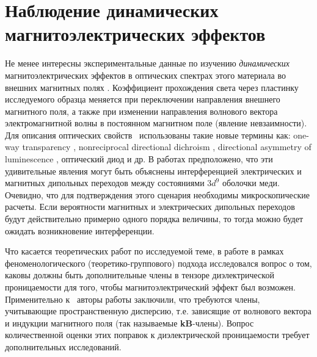 \section{Наблюдение динамических магнитоэлектрических эффектов}\label{sec:ch1/sec2}

Не менее интересны экспериментальные данные по изучению \emph{динамических} магнитоэлектрических эффектов в оптических спектрах этого материала во внешних магнитных полях \cite{Saito2008prl, Saito2008jpsj, Lovesey2009, Toyoda2015, Boldyrev2015}. Коэффициент прохождения света через пластинку исследуемого образца меняется при переключении направления внешнего магнитного поля, а также при изменении направления волнового вектора электромагнитной волны в постоянном магнитном поле (явление невзаимности). Для описания оптических свойств \cbo\ использованы такие новые термины как: one-way transparency \cite{Toyoda2015}, nonreciprocal directional dichroism \cite{Toyoda2015}, directional asymmetry of luminescence \cite{Toyoda2016}, оптический диод и др. В работах \cite{Toyoda2015, Toyoda2016} предположено, что эти удивительные явления могут быть объяснены интерференцией электрических и магнитных дипольных переходов между состояниями \(3d^9\) оболочки меди. Очевидно, что для подтверждения этого сценария необходимы микроскопические расчеты. Если вероятности магнитных и электрических дипольных переходов будут действительно примерно одного порядка величины, то тогда можно будет ожидать возникновение интерференции.

Что касается теоретических работ по исследуемой теме, в работе \cite{Nikitchenko2021} в рамках феноменологического (теоретико-группового) подхода исследовался вопрос о том, каковы должны быть дополнительные члены в тензоре диэлектрической проницаемости для того, чтобы магнитоэлектрический эффект был возможен. Применительно к \cbo\ авторы работы \cite{Nikitchenko2021} заключили, что требуются члены, учитывающие пространственную дисперсию, т.е. зависящие от волнового вектора и индукции магнитного поля (так называемые \textbf{kB}-члены). Вопрос количественной оценки этих поправок к диэлектрической проницаемости требует дополнительных исследований.

\FloatBarrier
